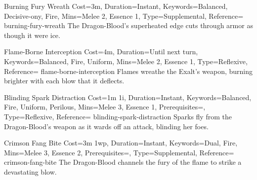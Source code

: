 \begin{Charm}{Burning Fury Wreath}{%
    Cost=3m,
    Duration=Instant,
    Keywords={Balanced, Decisive-ony, Fire},
    Mins={Melee 2, Essence 1},
    Type=Supplemental,
    Reference=\cite*[p.~225]{db}
}{burning-fury-wreath}
    The Dragon-Blood's superheated edge cuts through armor as though it were ice.

\end{Charm}


\begin{Charm}{Flame-Borne Interception}{%
    Cost=4m,
    Duration=Until next turn,
    Keywords={Balanced, Fire, Uniform},
    Mins={Melee 2, Essence 1},
    Type=Reflexive,
    Reference=\cite*[p.~225]{db}
}{flame-borne-interception}
    Flames wreathe the Exalt's weapon, burning brighter with each blow that it
    deflects. 
\end{Charm}


\DocumentColumnBreak
\begin{Charm}{Blinding Spark Distraction}{%
    Cost=1m 1i,
    Duration=Instant,
    Keywords={Balanced, Fire, Uniform, Perilous},
    Mins={Melee 3, Essence 1},
    Prerequisites=,
    Type=Reflexive,
    Reference=\cite*[p.~225]{db}
}{blinding-spark-distraction}
    Sparks fly from the Dragon-Blood's weapon as it wards off an attack, blinding
    her foes. 
\end{Charm}


\begin{Charm}{Crimson Fang Bite}{%
    Cost=3m 1wp,
    Duration=Instant,
    Keywords={Dual, Fire},
    Mins={Melee 3, Essence 2},
    Prerequisites=,
    Type=Supplemental,
    Reference=\cite*[p.~225]{db}
}{crimson-fang-bite}
    The Dragon-Blood channels the fury of the flame to strike a devastating blow.
\end{Charm}



